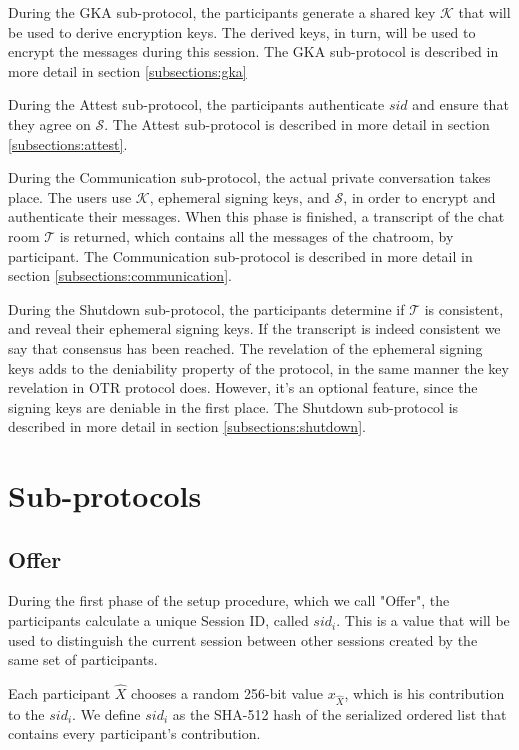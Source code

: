 During the GKA sub-protocol, the participants generate a shared key $\mathcal{K}$ that will be used to derive encryption keys. The derived keys, in turn, will be used to encrypt the messages during this session. The GKA sub-protocol is described in more detail in section \ref{subsections:gka}

During the Attest sub-protocol, the participants authenticate $sid$ and ensure that they agree on $\mathcal{S}$. The Attest sub-protocol is described in more detail in section \ref{subsections:attest}. 

During the Communication sub-protocol, the actual private conversation takes place. The users use $\mathcal{K}$, ephemeral signing keys, and $\mathcal{S}$, in order to encrypt and authenticate their messages. When this phase is finished, a transcript of the chat room $\mathcal{T}$ is returned, which contains all the messages of the chatroom, by participant. The Communication sub-protocol is described in more detail in section \ref{subsections:communication}. 

During the Shutdown sub-protocol, the participants determine if $\mathcal{T}$ is consistent, and reveal their ephemeral signing keys. If the transcript is indeed consistent we say that consensus has been reached. The revelation of the ephemeral signing keys adds to the deniability property of the protocol, in the same manner the key revelation in OTR protocol does. However, it’s an optional feature, since the signing keys are deniable in the first place. The Shutdown sub-protocol is described in more detail in section \ref{subsections:shutdown}. 


\section{Sub-protocols}

\subsection{Offer}
\label{subsections:offer}
During the first phase of the setup procedure, which we call "Offer", the participants calculate a unique Session ID, called $sid_i$. This is a value that will be used to distinguish the current session between other sessions created by the same set of participants.

Each participant $\hat{X}$ chooses a random 256-bit value $x_{\hat{X}}$, which is his contribution to the $sid_i$. We define $sid_i$ as the SHA-512 hash of the serialized ordered list that contains every participant's contribution.

